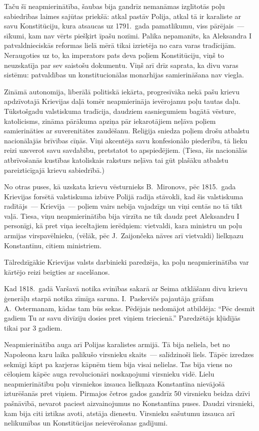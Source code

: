 \documentclass[twoside,a5paper,12pt,fleqn,openany]{extbook}
\begin{document}
Taču šī neapmierinātība, šaubas bija gandrīz nemanāmas izglītotās poļu sabiedrības laimes sajūtas priekšā: atkal pastāv Polija, atkal tā ir karaliste ar savu Konstitūciju, kura atsaucas uz 1791.~gada pamatlikumu, viss pārējais~--- sīkumi, kam nav vērts piešķirt īpašu nozīmi. Palika nepamanīts, ka Aleksandra I patvaldnieciskās reformas lielā mērā tikai izrietēja no cara varas tradīcijām. Neraugoties uz to, ka imperators pats deva poļiem Konstitūciju, viņš to neuzskatīja par sev saistošu dokumentu. Viņš arī drīz saprata, ka divu varas sistēmu: patvaldības un konstitucionālas monarhijas samierināšana nav viegla.

Zināmā autonomija, liberālā politiskā iekārta, progresīvāka nekā pašu krievu apdzīvotajā Krievijas daļā tomēr neapmierināja ievērojamu poļu tautas daļu. Tūkstošgadu valstiskuma tradīcija, daudziem sasniegumiem bagātā vēsture, katolicisms, zināma pārākuma apziņa pār iekarotājiem neļāva poļiem samierināties ar suverenitātes zaudēšanu. Reliģija sniedza poļiem drošu atbalstu nacionālajās brīvības cīņās. Viņi akcentēja savu konfesionālo piederību, tā lieku reizi uzsverot savu savdabību, pretstatot to apspiedējiem. (Tiesa, šis nacionālās atbrīvošanās kustības katoliskais raksturs neļāva tai gūt plašāku atbalstu pareizticīgajā krievu sabiedrībā.)

No otras puses, kā uzskata krievu vēsturnieks B.~Mironovs, pēc 1815.~gada Krievijas forsētā valstiskuma izbūve Polijā radīja stāvokli, kad šis valstiskuma radītājs~--- Krievija~--- poļiem vairs nebija vajadzīgs un viņi centās no tā tikt vaļā. Tiesa, viņu neapmierinātība bija virzīta ne tik daudz pret Aleksandru I personīgi, kā pret viņa ieceltajiem ierēdņiem: vietvaldi, kara ministru un poļu armijas virspavēlnieku, (vēlāk, pēc J.~Zaijončeka nāves arī vietvaldi) lielkņazu Konstantīnu, citiem ministriem.

Tālredzīgākie Krievijas valsts darbinieki paredzēja, ka poļu neapmierinātība var kārtējo reizi beigties ar sacelšanos.

Kad 1818.~gadā Varšavā notika svinības sakarā ar Seima atklāšanu divu krievu ģenerāļu starpā notika zīmīga saruna. I.~Paskevičs pajautāja grāfam A.~Ostermanam, kādas tam būs sekas. Pēdējais nedomājot atbildēja: ``Pēc desmit gadiem Tu ar savu divīziju dosies pret viņiem triecienā.'' Paredzētājs kļūdījās tikai par 3 gadiem.

Neapmierinātība auga arī Polijas karalistes armijā. Tā bija neliela, bet no Napoleona karu laika palikušo virsnieku skaits~--- salīdzinoši liels. Tāpēc izredzes sekmīgi kāpt pa karjeras kāpnēm tiem bija visai nelielas. Tas bija viens no cēloņiem kāpēc auga revolucionāri noskaņojumi virsnieku vidē. Lielu neapmierinātību poļu virsniekos izsauca lielkņaza Konstantīna nievājošā izturēšanās pret viņiem. Pirmajos četros gados gandrīz 50 virsnieku beidza dzīvi pašnāvībā, nevarot paciest aizvainojumus no Konstantīna puses. Daudzi virsnieki, kam bija citi iztikas avoti, atstāja dienestu. Virsnieku sašutumu izsauca arī nelikumības un Konstitūcijas neievērošanas gadījumi.
\end{document}
